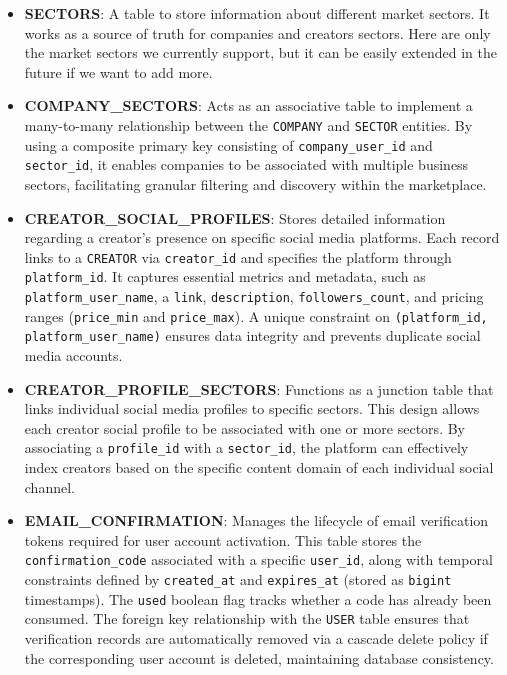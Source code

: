 \begin{itemize}
    \item \textbf{SECTORS}: A table to store information about different market sectors. It works as a source of truth for companies and creators sectors. Here are only the market sectors we currently support, but it can be easily extended in the future if we want to add more.

    \item \textbf{COMPANY\_SECTORS}: Acts as an associative table to implement a many-to-many relationship between the \texttt{COMPANY} and \texttt{SECTOR} entities. By using a composite primary key consisting of \texttt{company\_user\_id} and \texttt{sector\_id}, it enables companies to be associated with multiple business sectors, facilitating granular filtering and discovery within the marketplace.

    \item \textbf{CREATOR\_SOCIAL\_PROFILES}: Stores detailed information regarding a creator's presence on specific social media platforms. Each record links to a \texttt{CREATOR} via \texttt{creator\_id} and specifies the platform through \texttt{platform\_id}. It captures essential metrics and metadata, such as \texttt{platform\_user\_name}, a \texttt{link}, \texttt{description}, \texttt{followers\_count}, and pricing ranges (\texttt{price\_min} and \texttt{price\_max}). A unique constraint on \texttt{(platform\_id, platform\_user\_name)} ensures data integrity and prevents duplicate social media accounts.

    \item \textbf{CREATOR\_PROFILE\_SECTORS}: Functions as a junction table that links individual social media profiles to specific sectors. This design allows each creator social profile to be associated with one or more sectors. By associating a \texttt{profile\_id} with a \texttt{sector\_id}, the platform can effectively index creators based on the specific content domain of each individual social channel.

    \item \textbf{EMAIL\_CONFIRMATION}: Manages the lifecycle of email verification tokens required for user account activation. This table stores the \texttt{confirmation\_code} associated with a specific \texttt{user\_id}, along with temporal constraints defined by \texttt{created\_at} and \texttt{expires\_at} (stored as \texttt{bigint} timestamps). The \texttt{used} boolean flag tracks whether a code has already been consumed. The foreign key relationship with the \texttt{USER} table ensures that verification records are automatically removed via a cascade delete policy if the corresponding user account is deleted, maintaining database consistency.


\end{itemize}
